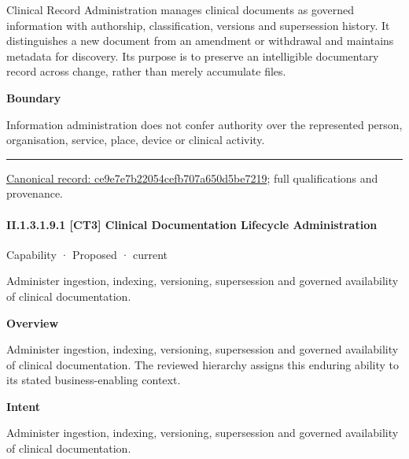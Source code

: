 Clinical Record Administration manages clinical documents as governed information with authorship, classification, versions and supersession history. It distinguishes a new document from an amendment or withdrawal and maintains metadata for discovery. Its purpose is to preserve an intelligible documentary record across change, rather than merely accumulate files.



\textbf{Boundary}



Information administration does not confer authority over the represented person, organisation, service, place, device or clinical activity.



\medskip\hrule\medskip

{\footnotesize \href{../../../../continuum/strategy/capability/ce9e7e7b22054cefb707a650d5be7219.md}{Canonical record: ce9e7e7b22054cefb707a650d5be7219}; full qualifications and provenance.}\par
\paragraph*{II.1.3.1.9.1 [CT3] Clinical Documentation Lifecycle Administration}
\label{navigation:II.1.3.1.9.1}

\label{element:df683100067b47e785037c27cfd17a3c}
{\small Capability · Proposed · current}\par

Administer ingestion, indexing, versioning, supersession and governed availability of clinical documentation.



\textbf{Overview}



Administer ingestion, indexing, versioning, supersession and governed availability of clinical documentation. The reviewed hierarchy assigns this enduring ability to its stated business-enabling context.



\textbf{Intent}



Administer ingestion, indexing, versioning, supersession and governed availability of clinical documentation.



